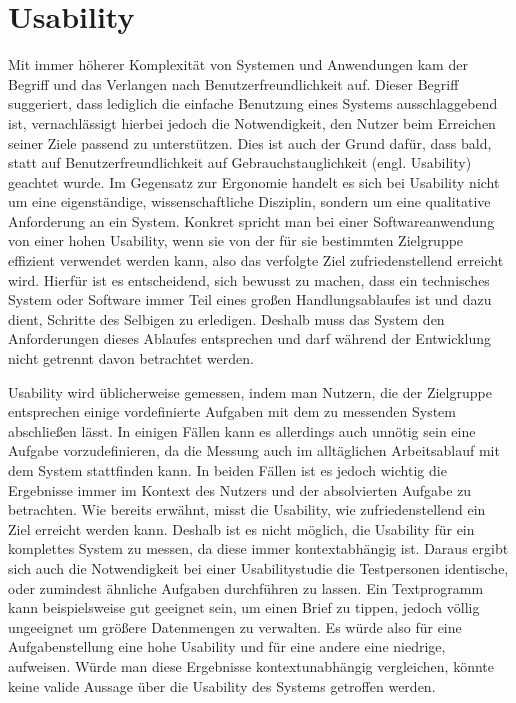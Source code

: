 \section{Usability}
Mit immer höherer Komplexität von Systemen und Anwendungen kam der Begriff und das Verlangen nach  \glqq Benutzerfreundlichkeit\grqq{} auf.
Dieser Begriff suggeriert, dass lediglich die einfache Benutzung eines Systems ausschlaggebend ist, vernachlässigt hierbei jedoch die Notwendigkeit, den Nutzer beim Erreichen seiner Ziele passend zu unterstützen.
Dies ist auch der Grund dafür, dass bald, statt auf \glqq Benutzerfreundlichkeit\grqq{}  auf \glqq Gebrauchstauglichkeit\grqq{}  (engl. Usability) geachtet wurde.
Im Gegensatz zur Ergonomie handelt es sich bei Usability nicht um eine eigenständige, wissenschaftliche Disziplin, sondern um eine qualitative Anforderung an ein System\cite{Sarodnick.2016}.
Konkret spricht man bei einer Softwareanwendung von einer hohen Usability, wenn sie von der für sie bestimmten Zielgruppe effizient verwendet werden kann, also das verfolgte Ziel zufriedenstellend erreicht wird\cite{Richter.2016}.
Hierfür ist es entscheidend, sich bewusst zu machen, dass ein technisches System oder Software immer Teil eines großen Handlungsablaufes ist und dazu dient, Schritte des Selbigen zu erledigen.
Deshalb muss das System den Anforderungen dieses Ablaufes entsprechen und darf während der Entwicklung nicht getrennt davon betrachtet werden\cite{Sarodnick.2016}.

Usability wird üblicherweise gemessen, indem man Nutzern, die der Zielgruppe entsprechen einige vordefinierte Aufgaben mit dem zu messenden System abschließen lässt. 
In einigen Fällen kann es allerdings auch unnötig sein eine Aufgabe vorzudefinieren, da die Messung auch im alltäglichen Arbeitsablauf mit dem System stattfinden kann.
In beiden Fällen ist es jedoch wichtig die Ergebnisse immer im Kontext des Nutzers und der absolvierten Aufgabe zu betrachten\cite{Nielsen.1995?}. 
Wie bereits erwähnt, misst die Usability, wie zufriedenstellend ein Ziel erreicht werden kann.
Deshalb ist es nicht möglich, die Usability für ein komplettes System zu messen, da diese immer kontextabhängig ist.
Daraus ergibt sich auch die Notwendigkeit bei einer Usabilitystudie die Testpersonen identische, oder zumindest ähnliche Aufgaben durchführen zu lassen.
Ein Textprogramm kann beispielsweise gut geeignet sein, um einen Brief zu tippen, jedoch völlig ungeeignet um größere Datenmengen zu verwalten. Es würde also für eine Aufgabenstellung eine hohe Usability und für eine andere eine niedrige, aufweisen. 
Würde man diese Ergebnisse kontextunabhängig vergleichen, könnte keine valide Aussage über die Usability des Systems getroffen werden.

